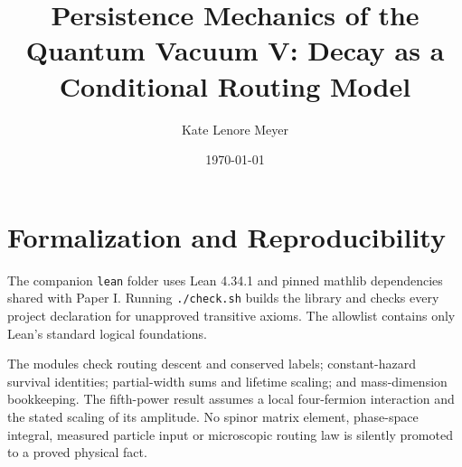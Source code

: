 \documentclass[aps,prd,twocolumn,showpacs,superscriptaddress,groupedaddress,nofootinbib,english]{revtex4-2}
\begin{document}
\title{Persistence Mechanics of the Quantum Vacuum V: Decay as a Conditional Routing Model}

\author{Kate Lenore Meyer}

\date{\today}



\maketitle %















\appendix
\section{Formalization and Reproducibility}
The companion \texttt{lean} folder uses Lean 4.34.1 and pinned mathlib dependencies shared with Paper I. Running \texttt{./check.sh} builds the library and checks every project declaration for unapproved transitive axioms. The allowlist contains only Lean's standard logical foundations.

The modules check routing descent and conserved labels; constant-hazard survival identities; partial-width sums and lifetime scaling; and mass-dimension bookkeeping. The fifth-power result assumes a local four-fermion interaction and the stated scaling of its amplitude. No spinor matrix element, phase-space integral, measured particle input or microscopic routing law is silently promoted to a proved physical fact.






\end{document}
